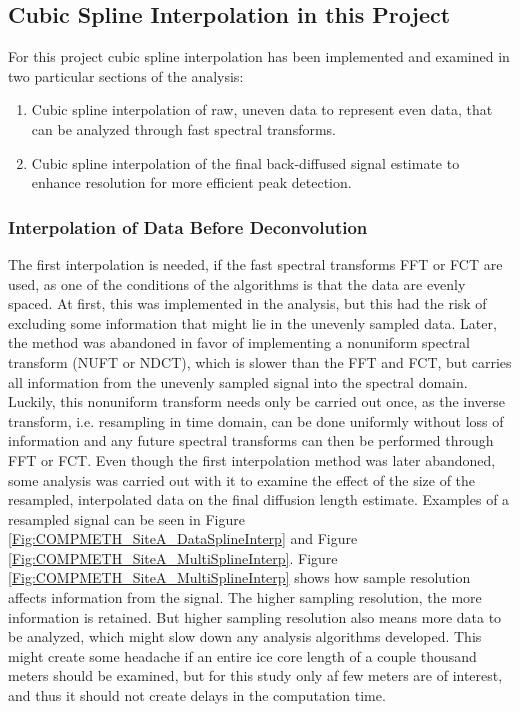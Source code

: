 \documentclass[../../CompleteThesis/Complete_1stDraft.tex]{subfiles}
\begin{document}
\subsection[Interpolation in this Project][Interpolation in this Project]{Cubic Spline Interpolation in this Project}
\label{Subsec:CompMeths_SplinesAndInterpolation_InterpolationInThisProj}
For this project cubic spline interpolation has been implemented and examined in two particular sections of the analysis: 
\begin{enumerate}
	\item Cubic spline interpolation of raw, uneven data to represent even data, that can be analyzed through fast spectral transforms.
	\item Cubic spline interpolation of the final back-diffused signal estimate to enhance resolution for more efficient peak detection.
\end{enumerate}

\subsubsection[Interpolation 1]{Interpolation of Data Before Deconvolution}
\label{Subsubsec:CompMethod_StabilityTests_Interpolation1}

The first interpolation is needed, if the fast spectral transforms FFT or FCT are used, as one of the conditions of the algorithms is that the data are evenly spaced. At first, this was implemented in the analysis, but this had the risk of excluding some information that might lie in the unevenly sampled data. Later, the method was abandoned in favor of implementing a nonuniform spectral transform (NUFT or NDCT), which is slower than the FFT and FCT, but carries all information from the unevenly sampled signal into the spectral domain. Luckily, this nonuniform transform needs only be carried out once, as the inverse transform, i.e. resampling in time domain, can be done uniformly without loss of information and any future spectral transforms can then be performed through FFT or FCT.
Even though the first interpolation method was later abandoned, some analysis was carried out with it to examine the effect of the size of the resampled, interpolated data on the final diffusion length estimate. Examples of a resampled signal can be seen in Figure \ref{Fig:COMPMETH_SiteA_DataSplineInterp} and Figure \ref{Fig:COMPMETH_SiteA_MultiSplineInterp}. Figure \ref{Fig:COMPMETH_SiteA_MultiSplineInterp} shows how sample resolution affects information from the signal. The higher sampling resolution, the more information is retained. But higher sampling resolution also means more data to be analyzed, which might slow down any analysis algorithms developed. This might create some headache if an entire ice core length of a couple thousand meters should be examined, but for this study only af few meters are of interest, and thus it should not create delays in the computation time.
\end{document}
